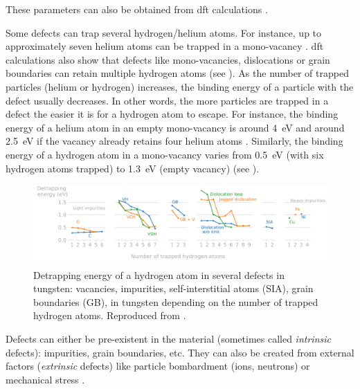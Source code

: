 These parameters can also be obtained from \gls{dft} calculations .

Some defects can trap several hydrogen/helium atoms.
For instance, up to approximately seven helium atoms can be trapped in a mono-\gls{vacancy} .
\gls{dft} calculations also show that defects like mono-vacancies, dislocations or grain boundaries can retain multiple hydrogen atoms (see ).
As the number of trapped particles (helium or hydrogen) increases, the binding energy of a particle with the defect usually decreases.
In other words, the more particles are trapped in a defect the easier it is for a hydrogen atom to escape.
For instance, the binding energy of a helium atom in an empty mono-\gls{vacancy} is around \SI{4}{eV} and around \SI{2.5}{eV} if the \gls{vacancy} already retains four helium atoms \cite{faney_spatially_2015}.
Similarly, the binding energy of a hydrogen atom in a mono-\gls{vacancy} varies from \SI{0.5}{eV} (with six hydrogen atoms trapped) to \SI{1.3}{eV} (empty \gls{vacancy}) (see ).

\begin{figure}
    \centering
    \includegraphics[width=\linewidth]{Figures/Chapter1/trapping_energy_hydrogen_in_tungsten.pdf}
    \caption{Detrapping energy of a hydrogen atom in several defects in tungsten: vacancies, impurities, self-interstitial atoms (SIA), grain boundaries (GB), in tungsten depending on the number of trapped hydrogen atoms. Reproduced from \cite{hodille_study_2016}.}
\end{figure}

Defects can either be pre-existent in the material (sometimes called \textit{intrinsic} defects): impurities, grain boundaries, etc.
They can also be created from external factors (\textit{extrinsic} defects) like particle bombardment (ions, neutrons)  or mechanical stress .

